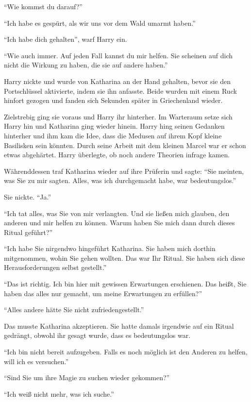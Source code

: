 \enquote{Wie kommst du darauf?}

\enquote{Ich habe es gespürt, als wir uns vor dem Wald umarmt haben.}

\enquote{Ich habe dich gehalten}, warf Harry ein.

\enquote{Wie auch immer. Auf jeden Fall kannst du mir helfen. Sie scheinen auf dich nicht die Wirkung zu haben, die sie auf andere haben.}

Harry nickte und wurde von Katharina an der Hand gehalten, bevor sie den Portschlüssel aktivierte, indem sie ihn anfasste. Beide wurden mit einem Ruck hinfort gezogen und fanden sich Sekunden später in Griechenland wieder.

Zielstrebig ging sie voraus und Harry ihr hinterher. Im Warteraum setze sich Harry hin und Katharina ging wieder hinein. Harry hing seinen Gedanken hinterher und ihm kam die Idee, dass die Medusen auf ihrem Kopf kleine Basilisken sein könnten. Durch seine Arbeit mit dem kleinen Marcel war er schon etwas abgehärtet. Harry überlegte, ob noch andere Theorien infrage kamen.

Währenddessen traf Katharina wieder auf ihre Prüferin und sagte: \enquote{Sie meinten, was Sie zu mir sagten. Alles, was ich durchgemacht habe, war bedeutungslos.}

Sie nickte. \enquote{Ja.}

\enquote{Ich tat alles, was Sie von mir verlangten. Und sie ließen mich glauben, den anderen und mir helfen zu können. Warum haben Sie mich dann durch dieses Ritual geführt?}

\enquote{Ich habe Sie nirgendwo hingeführt Katharina. Sie haben mich dorthin mitgenommen, wohin Sie gehen wollten. Das war Ihr Ritual. Sie haben sich diese Herausforderungen selbst gestellt.}

\enquote{Das ist richtig. Ich bin hier mit gewissen Erwartungen erschienen. Das heißt, Sie haben das alles nur gemacht, um meine Erwartungen zu erfüllen?}

\enquote{Alles andere hätte Sie nicht zufriedengestellt.}

Das musste Katharina akzeptieren. Sie hatte damals irgendwie auf ein Ritual gedrängt, obwohl ihr gesagt wurde, dass es bedeutungslos war.

\enquote{Ich bin nicht bereit aufzugeben. Falls es noch möglich ist den Anderen zu helfen, will ich es versuchen.}

\enquote{Sind Sie um ihre Magie zu suchen wieder gekommen?}

\enquote{Ich weiß nicht mehr, was ich suche.}


